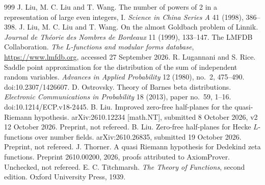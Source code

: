 \begin{thebibliography}{999}
 J. Liu, M. C. Liu and T. Wang. The number of powers of 2 in a representation of large even integers, I. \emph{Science in China Series A} 41 (1998), 386--398.
 J. Liu, M. C. Liu and T. Wang. On the almost Goldbach problem of Linnik. \emph{Journal de Th\'eorie des Nombres de Bordeaux} 11 (1999), 133--147.
 The LMFDB Collaboration. \emph{The $L$-functions and modular forms database}, \url{https://www.lmfdb.org}, accessed 27 September 2026.
 R. Lugannani and S. Rice. Saddle point approximation for the distribution of the sum of independent random variables. \emph{Advances in Applied Probability} 12 (1980), no.~2, 475--490. doi:10.2307/1426607. %
 D. Ostrovsky. Theory of Barnes beta distributions. \emph{Electronic Communications in Probability} 18 (2013), paper no.~59, 1--16. doi:10.1214/ECP.v18-2445. %
 B. Liu. Improved zero-free half-planes for the quasi-Riemann hypothesis. arXiv:2610.12234 [math.NT], submitted 8 October 2026, v2 12 October 2026. Preprint, not refereed. %
 B. Liu. Zero-free half-planes for Hecke $L$-functions over number fields. arXiv:2610.26835, submitted 19 October 2026. Preprint, not refereed. %
 J. Thorner. A quasi Riemann hypothesis for Dedekind zeta functions. Preprint 2610.00200, 2026, proofs attributed to AxiomProver. Unchecked, not refereed.
 E. C. Titchmarsh. \emph{The Theory of Functions}, second edition. Oxford University Press, 1939.

\end{thebibliography}

